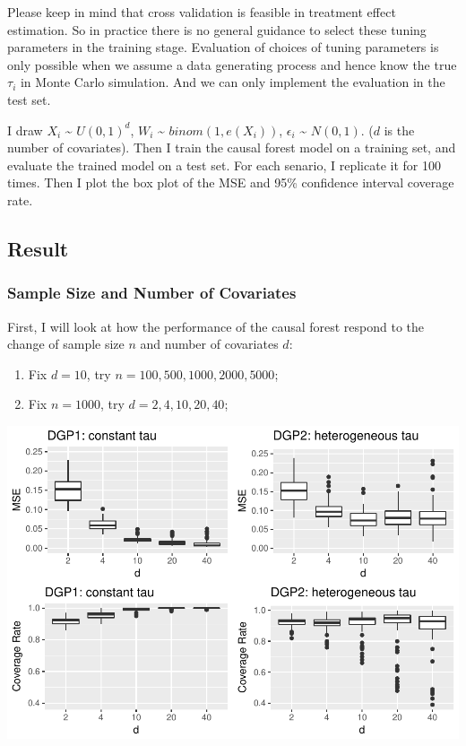 \documentclass[]{article}
\begin{document}
Please keep in mind that cross validation is feasible in treatment
effect estimation. So in practice there is no general guidance to select
these tuning parameters in the training stage. Evaluation of choices of
tuning parameters is only possible when we assume a data generating
process and hence know the true \(\tau_{i}\) in Monte Carlo simulation.
And we can only implement the evaluation in the test set.

I draw \(X_{i}\) \textasciitilde{} \(U(0,1)^{d}\), \(W_{i}\)
\textasciitilde{} \(binom(1,e(X_{i}))\), \(\epsilon_{i}\)
\textasciitilde{} \(N(0,1)\). (\(d\) is the number of covariates). Then
I train the causal forest model on a training set, and evaluate the
trained model on a test set. For each senario, I replicate it for 100
times. Then I plot the box plot of the MSE and 95\% confidence interval
coverage rate.

\subsection{Result}\label{result}

\subsubsection{Sample Size and Number of
Covariates}\label{sample-size-and-number-of-covariates}

First, I will look at how the performance of the causal forest respond
to the change of sample size \(n\) and number of covariates \(d\):

\begin{enumerate}
\def\labelenumi{\arabic{enumi}.}
\item
  Fix \(d=10\), try \(n=100, 500, 1000, 2000, 5000\);
\item
  Fix \(n=1000\), try \(d=2, 4, 10, 20, 40\);
\end{enumerate}

\includegraphics{report_files/figure-latex/unnamed-chunk-2-1.pdf}
\end{document}
